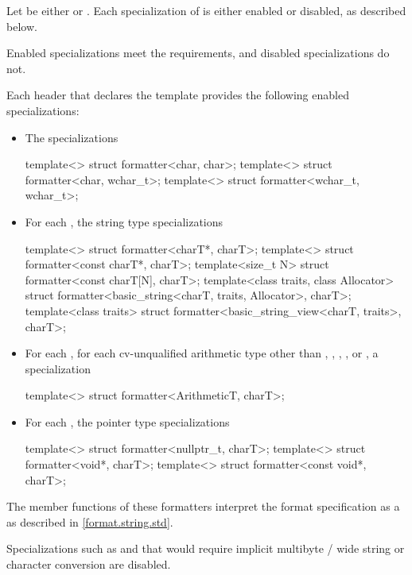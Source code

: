 \pnum
Let  be either  or .
Each specialization of  is either enabled or disabled,
as described below.
\begin{note}
Enabled specializations meet the  requirements,
and disabled specializations do not.
\end{note}
Each header that declares the template 
provides the following enabled specializations:
\begin{itemize}
\item
{}%
The specializations
\begin{codeblock}
template<> struct formatter<char, char>;
template<> struct formatter<char, wchar_t>;
template<> struct formatter<wchar_t, wchar_t>;
\end{codeblock}

\item
{}%
For each ,
the string type specializations
\begin{codeblock}
template<> struct formatter<charT*, charT>;
template<> struct formatter<const charT*, charT>;
template<size_t N> struct formatter<const charT[N], charT>;
template<class traits, class Allocator>
  struct formatter<basic_string<charT, traits, Allocator>, charT>;
template<class traits>
  struct formatter<basic_string_view<charT, traits>, charT>;
\end{codeblock}

\item
{}%
For each ,
for each cv-unqualified arithmetic type 
other than
,
,
,
, or
,
a specialization
\begin{codeblock}
template<> struct formatter<ArithmeticT, charT>;
\end{codeblock}

\item
{}%
%
For each ,
the pointer type specializations
\begin{codeblock}
template<> struct formatter<nullptr_t, charT>;
template<> struct formatter<void*, charT>;
template<> struct formatter<const void*, charT>;
\end{codeblock}
\end{itemize}
The  member functions of these formatters
interpret the format specification
as a 
as described in \ref{format.string.std}.
\begin{note}
Specializations such as 
and 
that would require implicit
multibyte / wide string or character conversion are disabled.
\end{note}

